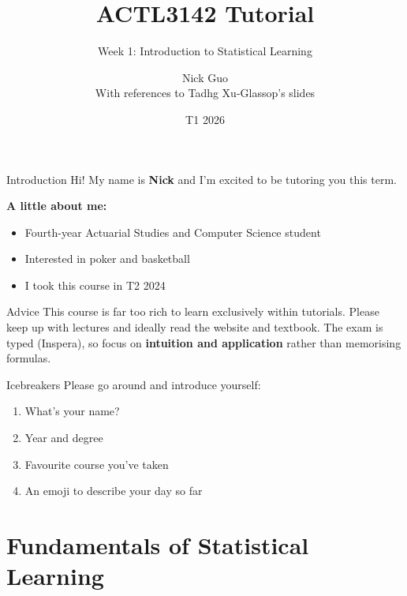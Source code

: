 \documentclass[aspectratio=169]{beamer}
\author{\texorpdfstring{Nick Guo\\{\small With references to Tadhg Xu-Glassop's slides}}{Nick Guo}}
\title{ACTL3142 Tutorial}
\subtitle{Week 1: Introduction to Statistical Learning}
\institute{School of Risk and Actuarial Studies, UNSW Sydney}
\date{T1 2026}
\begin{document}
\begin{frame}[plain]
	\titlepage
\end{frame}

\begin{frame}{Introduction}
	Hi! My name is \textbf{Nick} and I'm excited to be tutoring you this term.

	\bigskip
	\textbf{A little about me:}
	\begin{itemize}
		\item Fourth-year Actuarial Studies and Computer Science student
		\item Interested in poker and basketball
		\item I took this course in T2 2024
	\end{itemize}

	\bigskip
	\begin{alertblock}{Advice}
		This course is far too rich to learn exclusively within tutorials. Please keep up with lectures and ideally read the website and textbook. The exam is typed (Inspera), so focus on \textbf{intuition and application} rather than memorising formulas.
	\end{alertblock}
\end{frame}

\begin{frame}{Icebreakers}
	Please go around and introduce yourself:

	\bigskip
	\begin{enumerate}
		\item What's your name?
		\item Year and degree
		\item Favourite course you've taken
		\item An emoji to describe your day so far
	\end{enumerate}
\end{frame}

\section{Fundamentals of Statistical Learning}
\end{document}
